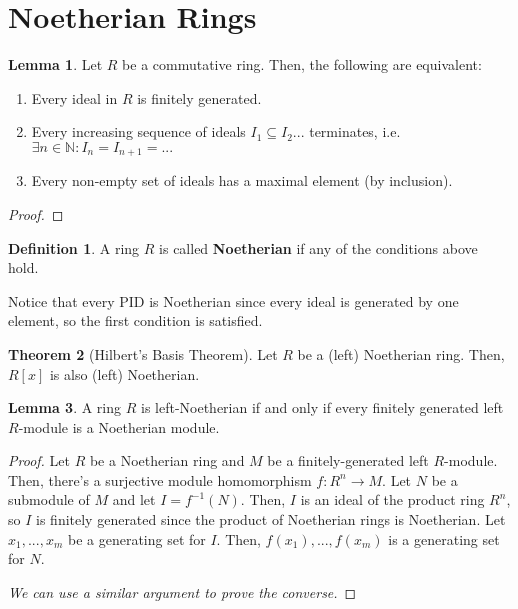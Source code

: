 \documentclass{article}
\theoremstyle{definition}
\newtheorem{definition}{Definition}
\newtheorem{theorem}{Theorem}[section]
\newtheorem{lemma}[theorem]{Lemma}
\begin{document}
\section{Noetherian Rings}

\begin{lemma}
    Let $R$ be a commutative ring. Then, the following are equivalent:

    \begin{enumerate}
        \item Every ideal in $R$ is finitely generated.
        \item Every increasing sequence of ideals $I_{1} \subseteq I_{2} ...$ terminates, i.e. $\exists n \in \mathbb{N}: I_{n} = I_{n+1} = ...$
        \item Every non-empty set of ideals has a maximal element (by inclusion).
    \end{enumerate}
\end{lemma}
\begin{proof}
    
\end{proof}

\begin{definition}
    A ring $R$ is called \textbf{Noetherian} if any of the conditions above hold.
\end{definition}

Notice that every PID is Noetherian since every ideal is generated by one element, so the first condition is satisfied.

\begin{theorem}[Hilbert's Basis Theorem]
    Let $R$ be a (left) Noetherian ring. Then, $R[x]$ is also (left) Noetherian.
\end{theorem}

\begin{lemma}
    A ring $R$ is left-Noetherian if and only if every finitely generated left $R$-module is a Noetherian module.
\end{lemma}
\begin{proof}
    Let $R$ be a Noetherian ring and $M$ be a finitely-generated left $R$-module. Then, there's a surjective module homomorphism $f: R^{n} \xrightarrow{} M$. Let $N$ be a submodule of $M$ and let $I = f^{-1}(N)$. Then, $I$ is an ideal of the product ring $R^{n}$, so $I$ is finitely generated since the product of Noetherian rings is Noetherian. Let $x_{1},...,x_{m}$ be a generating set for $I$. Then, $f(x_{1}), ..., f(x_{m})$ is a generating set for $N$.

    \textit{We can use a similar argument to prove the converse.}
\end{proof}
\end{document}
